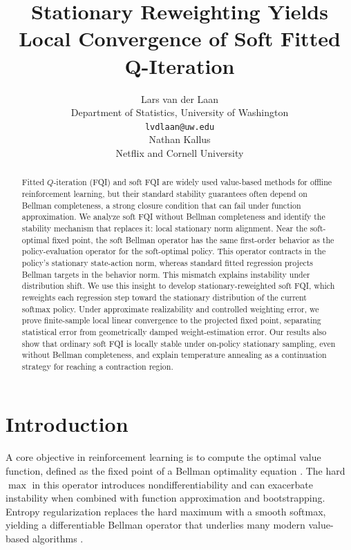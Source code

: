 \documentclass{article}
\title{Stationary Reweighting Yields Local Convergence of Soft Fitted Q-Iteration}
\author{%
  Lars van der Laan \\
  Department of Statistics, University of Washington \\
  \texttt{lvdlaan@uw.edu} \\
  \And
  Nathan Kallus \\
  Netflix and Cornell University
}
\theoremstyle{plain}
\theoremstyle{definition}
\theoremstyle{remark}
\begin{document}
\maketitle
\begin{abstract}
Fitted \(Q\)-iteration (FQI) and soft FQI are widely used value-based methods for
offline reinforcement learning, but their standard stability guarantees often
depend on Bellman completeness, a strong closure condition that can fail under
function approximation. We analyze soft FQI without Bellman completeness and
identify the stability mechanism that replaces it: local stationary norm
alignment. Near the soft-optimal fixed point, the soft Bellman operator has the
same first-order behavior as the policy-evaluation operator for the soft-optimal
policy. This operator contracts in the policy's stationary state-action norm,
whereas standard fitted regression projects Bellman targets in the behavior
norm. This mismatch explains instability under distribution shift. We use this
insight to develop stationary-reweighted soft FQI, which reweights each
regression step toward the stationary distribution of the current softmax policy.
Under approximate realizability and controlled weighting error, we prove
finite-sample local linear convergence to the projected fixed point, separating
statistical error from geometrically damped weight-estimation error. Our results
also show that ordinary soft FQI is locally stable under on-policy stationary
sampling, even without Bellman completeness, and explain temperature annealing as
a continuation strategy for reaching a contraction region.
\end{abstract}
\section{Introduction}

A core objective in reinforcement learning is to compute the optimal value
function, defined as the fixed point of a Bellman optimality equation
\citep{bellman1966dynamic}. The hard \(\max\) in this operator introduces
nondifferentiability and can exacerbate instability when combined with function
approximation and bootstrapping. Entropy regularization replaces the hard maximum
with a smooth softmax, yielding a differentiable Bellman operator that underlies
many modern value-based algorithms
\citep{ziebart2008maximum,ziebart2010causal,haarnoja2017reinforcement,
haarnoja2018soft}.
 


 
\end{document}

